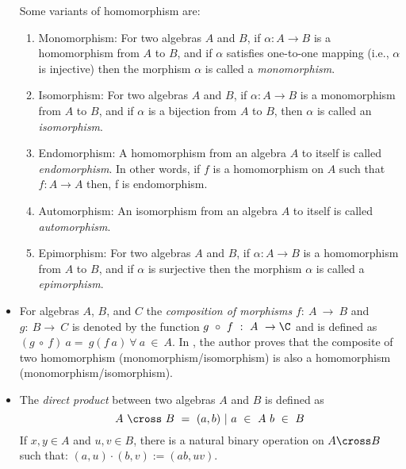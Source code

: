 \begin{itemize}
    Some variants of homomorphism are:
    \begin{enumerate}
        \item  Monomorphism: For two algebras $A$ and $B$, if \(\alpha : A
        \rightarrow B \) is a homomorphism from $A$ to $B$, and if \(\alpha\)
        satisfies one-to-one mapping (i.e., \(\alpha\) is injective) then the
        morphism \(\alpha\) is called a \textit{monomorphism}.

        \item Isomorphism: For two algebras $A$ and $B$, if \(\alpha : A \rightarrow B \)  is
        a monomorphism from $A$ to $B$, and if \(\alpha\) is a bijection from
        $A$ to $B$, then \(\alpha\) is called an \textit{isomorphism}.  

        \item Endomorphism: A homomorphism from an algebra $A$ to itself is
        called \textit{endomorphism}. In other words, if $f$ is a homomorphism on $A$
        such that $f:A\rightarrow A$ then, f is endomorphism.

        \item Automorphism: An isomorphism from an algebra $A$ to itself is
        called \textit{automorphism}.

        \item Epimorphism: For two algebras $A$ and $B$, if \(\alpha : A
        \rightarrow B \) is a homomorphism from $A$ to $B$, and if \(\alpha\) is
        surjective then the morphism \(\alpha\) is called a
        \textit{epimorphism}.
    \end{enumerate}

    \item For algebras $A$, $B$, and $C$ the \textit{composition of morphisms} $f:\ A \
    \rightarrow \ B$ and $g:\ B \rightarrow\ C$ is denoted by the function $g\
    \circ\ f\ :\ A\ \rightarrow \C$ and is defined as $(g\ \circ\ f)\ a = \ g(f\
    a) \ \forall\ a\ \in\ A$. In \cite{sankappanavar1981course}, the author
    proves that the composite of two homomorphism (monomorphism/isomorphism) is
    also a homomorphism (monomorphism/isomorphism).

    \item The \textit{direct product} between two algebras $A$ and $B$ is
    defined as \[A\ \cross\ B\ =\ {(a,b)\ |\ a \ \in \ A\ b \ \in\ B}\] If
    $x,y\in A$ and $u,v \in B$, there is a natural binary operation on $A \cross
    B$ such that: $(a,u)\cdot(b,v):=(ab,uv)$. 

\end{itemize}
